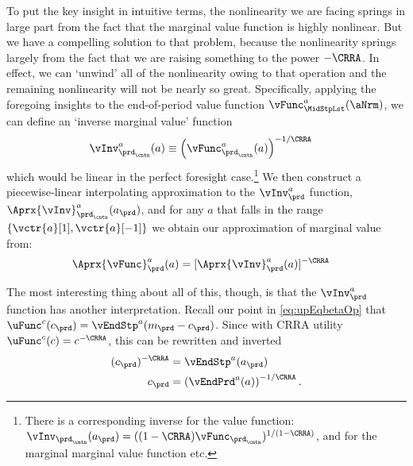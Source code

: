 \documentclass[\econtexRoot/SolvingMicroDSOPs]{subfiles}
\begin{document}
To put the key insight in intuitive terms, the nonlinearity we are facing springs in large part from the fact that the marginal value function is highly nonlinear.  But we have a compelling solution to that problem, because the nonlinearity springs largely from the fact that we are raising something to the power $-\CRRA$.  In effect, we can `unwind' all of the nonlinearity owing to that operation and the remaining nonlinearity will not be nearly so great.  Specifically, applying the foregoing insights to the end-of-period value function $\vFunc^{{a}}_{\MidStpLst}(\aNrm)$, we can define an `inverse marginal value' function
\begin{equation}\begin{gathered}\begin{aligned}
      \vInv_{\prd_\cntn}^{a}({a})  & \equiv  \left(\vFunc^{{a}}_{\prd_\cntn}({a})\right)^{-1/\CRRA} \label{eq:cGoth}
    \end{aligned}\end{gathered}\end{equation}
which would be linear in the perfect foresight case.\footnote{There is a corresponding inverse for the value function: $\vInv_{\prd_\cntn}({a}_{\prd})=((1-\CRRA)\vFunc_{\prd_\cntn})^{1/(1-\CRRA)}$, and for the marginal marginal value function etc.}  We then construct a piecewise-linear interpolating approximation to the $\vInv_{\prd}^{a}$ function, $\Aprx{\vInv}_{\prd_\cntn}^{a}({a}_{\prd})$, and for any ${a}$ that falls in the range $\{\vctr{a}[1],\vctr{a}[-1]\}$ we obtain our approximation of marginal value from:
\begin{equation}\begin{gathered}\begin{aligned}
      \Aprx{\vFunc}_{\prd}^{a}({a}) & =
      [\Aprx{\vInv}_{\prd}^{a}({a})]^{-\CRRA}
    \end{aligned}\end{gathered}\end{equation}

The most interesting thing about all of this, though, is that the $\vInv^{a}_{\prd}$ function has another interpretation. Recall our point in \eqref{eq:upEqbetaOp} that $\uFunc^{{c}}({c}_{\prd}) = \vEndStp^{{a}}({m}_{\prd}-{c}_{\prd})$.  Since with CRRA utility $\uFunc^{c}({c})=c^{-\CRRA}$, this can be rewritten
and inverted
\begin{equation}\begin{gathered}\begin{aligned}
      ({c}_{\prd})^{-\CRRA} & = \vEndStp^{{a}}({a}_{\prd})
      \\ {c}_{\prd} & =      \left(\vEndPrd^{{a}}({a})\right)^{-1/\CRRA}.
    \end{aligned}\end{gathered}\end{equation}
\end{document}
